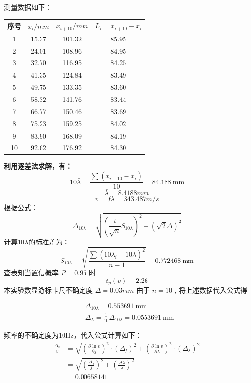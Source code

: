 \documentclass[UTF8]{ctexart}
\begin{document}
\noindent 测量数据如下：
\begin{center}
    \begin{tabular}{|c|c|c|c|}
        \hline  序号&$x_i/mm $&$x_{i+10}/mm $&$L_i=x_{i+10}-x_i$\\
        \hline  1&15.37&101.32&85.95\\
        \hline  2&24.01&108.96&84.95\\
        \hline  3&32.70&116.95&84.25\\
        \hline  4&41.35&124.84&83.49\\
        \hline  5&49.75&133.35&83.60\\
        \hline  6&58.32&141.76&83.44\\
        \hline  7&66.77&150.46&83.69\\
        \hline  8&75.23&159.25&84.02\\
        \hline  9&83.90&168.09&84.19\\
        \hline  10&92.62&176.92&84.30\\
        
        \hline
    \end{tabular}
\end{center}

\textbf{利用逐差法求解，有：}
$$
10 \bar{\lambda}=\frac{\sum\left(x_{i+10}-x_{i}\right)}{10}=84.188 \mathrm{~mm}
$$
$$
\bar{\lambda}=8.4188mm
$$
$$
v=f\lambda=343.487m/s
$$
根据公式：
$$
\Delta_{10 \lambda}=\sqrt{\left(\frac{t}{\sqrt{n}} S_{10 \lambda}\right)^{2}+(\sqrt{2} \Delta)^{2}}
$$
计算$10\lambda$的标准差为：
$$
S_{10 \lambda}=\sqrt{\frac{\sum\left(10 \lambda_{i}-10 \bar{\lambda}\right)^{2}}{n-1}}=0.772468 \mathrm{~mm}
$$
查表知当置信概率 $ P=0.95$  时
$$
t_{p}(v)=2.26
$$
本实验数显游标卡尺不确定度  $\Delta  = 0.03 m m$  由于  $n  = 10$ , 将上述数据代入公式得
    
\begin{align}
    &\Delta_{10 \lambda}  = 0.553691 \mathrm{~mm}\nonumber \\
    &\Delta_{\lambda}  =\frac{1}{10} \Delta_{10 \lambda}= 0.0553691\mathrm{~mm}\nonumber
\end{align}

\noindent 频率的不确定度为10Hz，代入公式计算如下：
\begin{align}
    \frac{\Delta_{v}}{v} & = \sqrt{\left(\frac{\partial \ln v}{\partial f}\right)^{2} \cdot\left(\Delta_{f}\right)^{2}+\left(\frac{\partial \ln v}{\partial \lambda}\right)^{2} \cdot\left(\Delta_{\lambda}\right)^{2}} \nonumber\\
     & = \sqrt{\left(\frac{\Delta_{f}}{f}\right)^{2}+\left(\frac{\Delta \lambda}{\lambda}\right)^{2}}\nonumber\\
     & =0.00658141\nonumber
\end{align}
\end{document}
